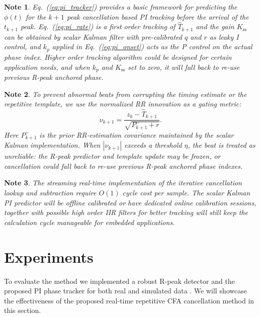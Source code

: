 \documentclass[conference]{IEEEtran}
\newtheorem{noteenv}{Note}
\begin{document}
\begin{noteenv}\label{note:innovation_gate}
Eq.~(\ref{eq:pi_tracker}) provides a basic framework for predicting the $\phi(t)$ for the $k+1$ peak cancellation based PI tracking
before the arrival of the $t_{k+1}$ peak. Eq.~(\ref{eq:pi_rate}) is a first order tracking of $\hat{T}_{k+1}$ and the gain
$K_{\mathrm{ss}}$ can be obtained by scalar Kalman filter with pre-calibrated $q$ and $r$ as leaky I control, and $k_p$
applied in Eq.~(\ref{eq:pi_onset}) acts as the P control on the actual phase index. Higher order tracking algorithm could be designed
for certain application needs, and when $k_p$ and $K_{\mathrm{ss}}$ set to zero, it will fall back to re-use previous R-peak anchored phase.
\end{noteenv}
\begin{noteenv}\label{note:innovation_gate}
To prevent abnormal beats from corrupting the timing estimate or the repetitive template, we use the
normalized RR innovation as a gating metric:
\begin{equation}
\nu_{k+1} = \frac{z_{k}-\hat{T}_{k+1}}{\sqrt{P_{k+1}^-+r}}.
\end{equation}
Here $P_{k+1}^-$ is the prior RR-estimation covariance maintained by the scalar Kalman implementation.
When $|\nu_{k+1}|$ exceeds a threshold $\eta$, the beat is treated as unreliable: the R-peak predictor
and template update may be frozen, or cancellation could fall back to re-use previous R-peak anchored phase indexes.
\end{noteenv}
\begin{noteenv}\label{note:realtime_complexity}
The streaming real-time implementation of the iterative cancellation lookup and subtraction require
$O(1)$ cycle cost per sample. The scalar Kalman PI predictor will be offline calibrated or have dedicated online calibration
sessions, together with possible high order IIR filters for better tracking will still keep the calculation cycle manageable for embedded applications.
\end{noteenv}

\section{Experiments}
\label{sec:experiments}

To evaluate the method we implemented a robust R-peak detector and the proposed PI phase tracker for both real and
simulated data \cite{rt_eeg_proc_ekg_ilc}. We will showcase the effectiveness of the proposed real-time repetitive CFA cancellation method 
in this section.
\end{document}
